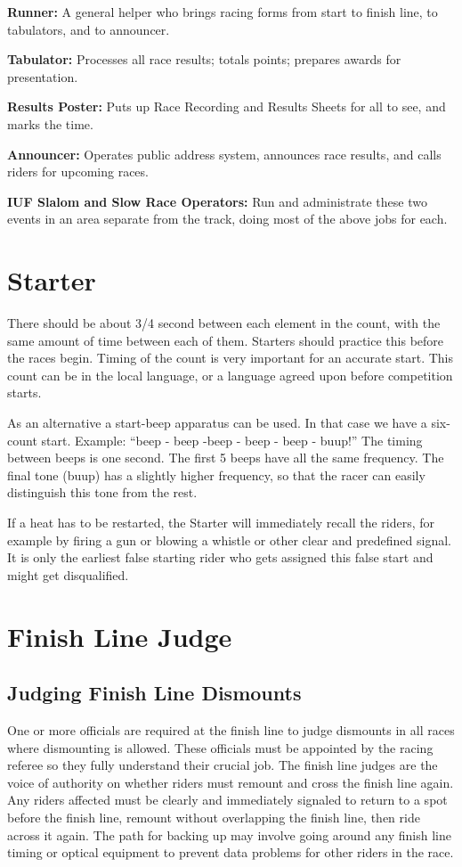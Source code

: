 \textbf{Runner:} A general helper who brings racing forms from start to finish line, to tabulators, and to announcer.

\textbf{Tabulator:} Processes all race results; totals points; prepares awards for presentation.

\textbf{Results Poster:} Puts up Race Recording and Results Sheets for all to see, and marks the time.

\textbf{Announcer:} Operates public address system, announces race results, and calls riders for upcoming races.

\textbf{IUF Slalom and Slow Race Operators:} Run and administrate these two events in an area separate from the track, doing most of the above jobs for each.

\section{Starter}

There should be about 3/4 second between each element in the count, with the same amount of time between each of them.
Starters should practice this before the races begin.
Timing of the count is very important for an accurate start.
This count can be in the local language, or a language agreed upon before competition starts.

As an alternative a start-beep apparatus can be used.
In that case we have a six-count start.
Example: ``beep - beep -beep - beep - beep - buup!''
The timing between beeps is one second.
The first 5 beeps have all the same frequency.
The final tone (buup) has a slightly higher frequency, so that the racer can easily distinguish this tone from the rest.

If a heat has to be restarted, the Starter will immediately recall the riders, for example by firing a gun or blowing a whistle or other clear and predefined signal.
It is only the earliest false starting rider who gets assigned this false start and might get disqualified.

\section{Finish Line Judge}

\subsection{Judging Finish Line Dismounts}
One or more officials are required at the finish line to judge dismounts in all races where dismounting is allowed.
These officials must be appointed by the racing referee so they fully understand their crucial job.
The finish line judges are the voice of authority on whether riders must remount and cross the finish line again.
Any riders affected must be clearly and immediately signaled to return to a spot before the finish line, remount without overlapping the finish line, then ride across it again.
The path for backing up may involve going around any finish line timing or optical equipment to prevent data problems for other riders in the race.

